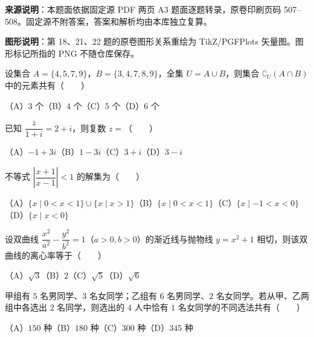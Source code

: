 


\begin{gktip}
\textbf{来源说明}：本题面依据固定源 PDF 两页 A3 题面逐题转录，原卷印刷页码 507–508。固定源不附答案，答案和解析均由本库独立复算。

\textbf{图形说明}：第 18、21、22 题的原卷图形关系重绘为 TikZ/PGFPlots 矢量图。图形标记所指的 PNG 不随仓库保存。
\end{gktip}


\begin{question}
设集合 $A=\{4,5,7,9\}$，$B=\{3,4,7,8,9\}$，全集 $U=A\cup B$，则集合 $\complement_U(A\cap B)$ 中的元素共有\mbox{（　　）}

（A）$3$ 个\quad（B）$4$ 个\quad（C）$5$ 个\quad（D）$6$ 个

\end{question}
\begin{question}
已知 $\dfrac{\overline z}{1+i}=2+i$，则复数 $z=$\mbox{（　　）}

（A）$-1+3i$\quad（B）$1-3i$\quad（C）$3+i$\quad（D）$3-i$

\end{question}
\begin{question}
不等式 $\left|\dfrac{x+1}{x-1}\right|<1$ 的解集为\mbox{（　　）}

（A）$\{x\mid0<x<1\}\cup\{x\mid x>1\}$\quad（B）$\{x\mid0<x<1\}$\quad（C）$\{x\mid-1<x<0\}$\quad（D）$\{x\mid x<0\}$

\end{question}
\begin{question}
设双曲线 $\dfrac{x^2}{a^2}-\dfrac{y^2}{b^2}=1$（$a>0,b>0$）的渐近线与抛物线 $y=x^2+1$ 相切，则该双曲线的离心率等于\mbox{（　　）}

（A）$\sqrt3$\quad（B）$2$\quad（C）$\sqrt5$\quad（D）$\sqrt6$

\end{question}
\begin{question}
甲组有 $5$ 名男同学、$3$ 名女同学；乙组有 $6$ 名男同学、$2$ 名女同学。若从甲、乙两组中各选出 $2$ 名同学，则选出的 $4$ 人中恰有 $1$ 名女同学的不同选法共有\mbox{（　　）}

（A）$150$ 种\quad（B）$180$ 种\quad（C）$300$ 种\quad（D）$345$ 种

\end{question}
